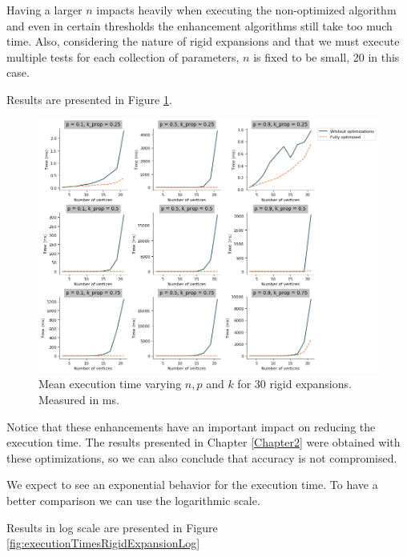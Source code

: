 Having a larger $n$ impacts heavily when executing the non-optimized algorithm and even in certain thresholds the enhancement algorithms still take too much time. Also, considering the nature of rigid expansions and that we must execute multiple tests for each collection of parameters, $n$ is fixed to be small, 20 in this case. 

Results are presented in Figure \ref{fig:executionTimesRigidExpansion}.

\begin{figure}[h!]
	\centering
	\includegraphics[scale=0.45]{Python/Figures/Time-execution-rigid-expansions.png}
	\caption{Mean execution time varying $n, p$ and $k$ for 30 rigid expansions. Measured in ms.}
	\label{fig:executionTimesRigidExpansion}
\end{figure}

Notice that these enhancements have an important impact on reducing the execution time. The results presented in Chapter \ref{Chapter2} were obtained with these optimizations, so we can also conclude that accuracy is not compromised.

We expect to see an exponential behavior for the execution time. To have a better comparison we can use the logarithmic scale.

Results in log scale are presented in Figure \ref{fig:executionTimesRigidExpansionLog}


